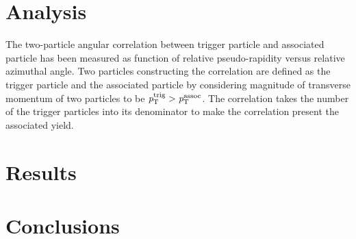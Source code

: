 \documentclass[ALICE,manyauthors]{cernphprep}
\begin{document}
\section {Analysis}
The two-particle angular correlation between trigger particle and associated particle has been measured as function of relative pseudo-rapidity versus relative azimuthal angle. Two particles constructing the correlation are defined as the trigger particle and the associated particle by considering magnitude of transverse momentum of two particles to be $\it{p}_{\rm{T}}^{\rm{trig}}>\it{p}_{\rm{T}}^{\rm{assoc}}$. The correlation takes the number of the trigger particles into its denominator to make the correlation present the associated yield. 

\section {Results}

\section{Conclusions}



\newenvironment{acknowledgement}{\relax}{\relax}

%

\newpage
\appendix
%
%







\clearpage


\end{document}
